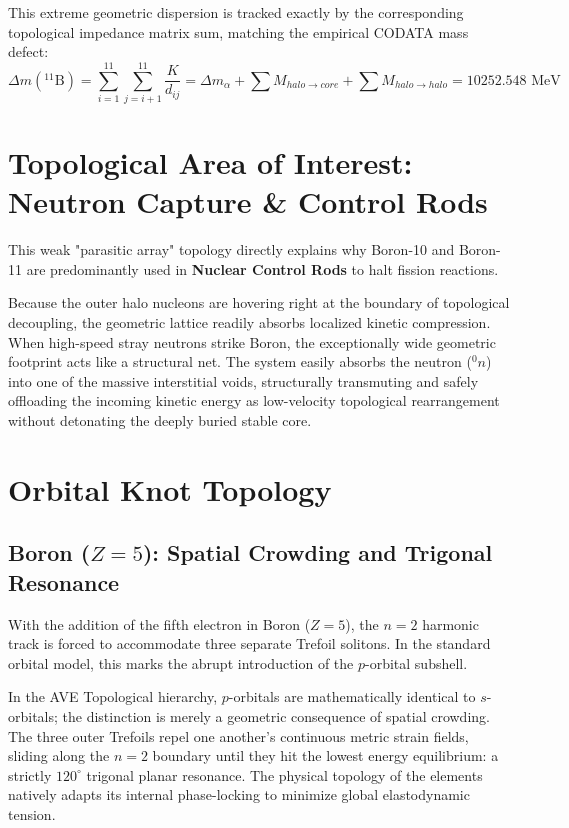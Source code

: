 This extreme geometric dispersion is tracked exactly by the corresponding topological impedance matrix sum, matching the empirical CODATA mass defect:
\begin{equation}
    \Delta m(^{11}\text{B}) = \sum_{i=1}^{11} \sum_{j=i+1}^{11} \frac{K}{d_{ij}} = \Delta m_{\alpha} + \sum M_{halo\rightarrow core} + \sum M_{halo\rightarrow halo} = 10252.548 \text{ MeV}
\end{equation}

\section{Topological Area of Interest: Neutron Capture \& Control Rods}
This weak "parasitic array" topology directly explains why Boron-10 and Boron-11 are predominantly used in \textbf{Nuclear Control Rods} to halt fission reactions. 

Because the outer halo nucleons are hovering right at the boundary of topological decoupling, the geometric lattice readily absorbs localized kinetic compression. When high-speed stray neutrons strike Boron, the exceptionally wide geometric footprint acts like a structural net. The system easily absorbs the neutron ($^0n$) into one of the massive interstitial voids, structurally transmuting and safely offloading the incoming kinetic energy as low-velocity topological rearrangement without detonating the deeply buried stable core. 


\section{Orbital Knot Topology}
\subsection{Boron ($Z=5$): Spatial Crowding and Trigonal Resonance}
With the addition of the fifth electron in Boron ($Z=5$), the $n=2$ harmonic track is forced to accommodate three separate Trefoil solitons. In the standard orbital model, this marks the abrupt introduction of the $p$-orbital subshell. 

In the AVE Topological hierarchy, $p$-orbitals are mathematically identical to $s$-orbitals; the distinction is merely a geometric consequence of spatial crowding. The three outer Trefoils repel one another's continuous metric strain fields, sliding along the $n=2$ boundary until they hit the lowest energy equilibrium: a strictly $120^\circ$ trigonal planar resonance. The physical topology of the elements natively adapts its internal phase-locking to minimize global elastodynamic tension.



